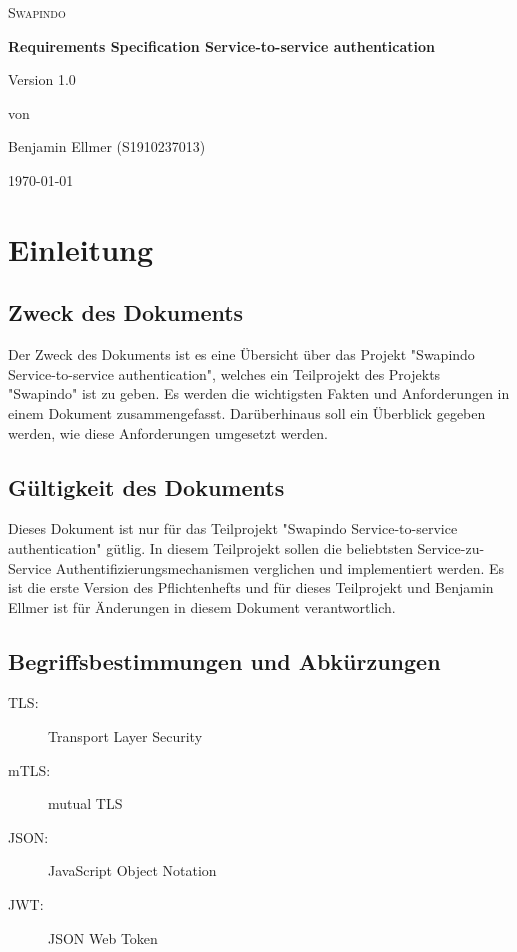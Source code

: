 \documentclass[14pt,a4paper]{extarticle}
\begin{document}
	\begin{titlepage}
		\centering
		{\scshape\LARGE Swapindo \par}
		\vspace{2.5cm}
		{\huge\bfseries Requirements Specification Service-to-service authentication \par}
		\vfill
		Version 1.0\par
		von\par
		Benjamin Ellmer (\textsc{S1910237013}) 
	
		\vfill
		{\large \today\par}
	\end{titlepage}
	\newpage

	\tableofcontents
	\newpage
	
	\section{Einleitung}
	\subsection{Zweck des Dokuments}
	Der Zweck des Dokuments ist es eine Übersicht über das Projekt "Swapindo Service-to-service authentication", welches ein Teilprojekt des Projekts "Swapindo" ist zu geben.
	Es werden die wichtigsten Fakten und Anforderungen in einem Dokument zusammengefasst.
	Darüberhinaus soll ein Überblick gegeben werden, wie diese Anforderungen umgesetzt werden.

	\subsection{Gültigkeit des Dokuments}
	Dieses Dokument ist nur für das Teilprojekt "Swapindo Service-to-service authentication" gütlig.
	In diesem Teilprojekt sollen die beliebtsten Service-zu-Service Authentifizierungsmechanismen verglichen und implementiert werden.
	Es ist die erste Version des Pflichtenhefts und für dieses Teilprojekt und Benjamin Ellmer ist für Änderungen in diesem Dokument verantwortlich.

	\subsection{Begriffsbestimmungen und Abkürzungen}
	\begin{description}
		\item[TLS:] Transport Layer Security
		\item[mTLS:] mutual TLS
		\item[JSON:] JavaScript Object Notation
		\item[JWT:] JSON Web Token
	\end{description}
\end{document}
